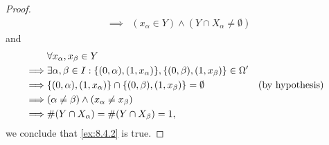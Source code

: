 \begin{proof}
\begin{align*}
    \implies & (x_\alpha \in Y) \land (Y \cap X_{\alpha} \neq \emptyset)
  \end{align*}
  and
  \begin{align*}
             & \forall x_{\alpha}, x_{\beta} \in Y                                                                                                        \\
    \implies & \exists \alpha, \beta \in I : \set{(0, \alpha), (1, x_{\alpha})}, \set{(0, \beta), (1, x_{\beta})} \in \Omega'                             \\
    \implies & \set{(0, \alpha), (1, x_{\alpha})} \cap \set{(0, \beta), (1, x_{\beta})} = \emptyset                           &  & \text{(by hypothesis)} \\
    \implies & (\alpha \neq \beta) \land (x_{\alpha} \neq x_{\beta})                                                                                      \\
    \implies & \#(Y \cap X_{\alpha}) = \#(Y \cap X_{\beta}) = 1,
  \end{align*}
  we conclude that \cref{ex:8.4.2} is true.
\end{proof}
